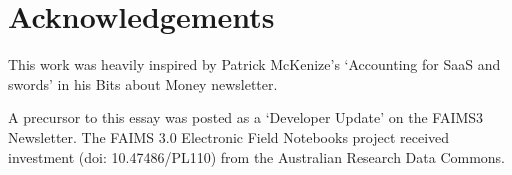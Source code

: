 \documentclass{scrarticle}
\begin{document}
\section{Acknowledgements}

This work was heavily inspired by Patrick McKenize's `Accounting for SaaS and swords' in his Bits about Money newsletter. 

A precursor to this essay was posted as a `Developer Update' on the FAIMS3 Newsletter. The FAIMS 3.0 Electronic Field Notebooks project received investment (doi: 10.47486/PL110) from the Australian Research Data Commons.



\printbibliography
\end{document}
